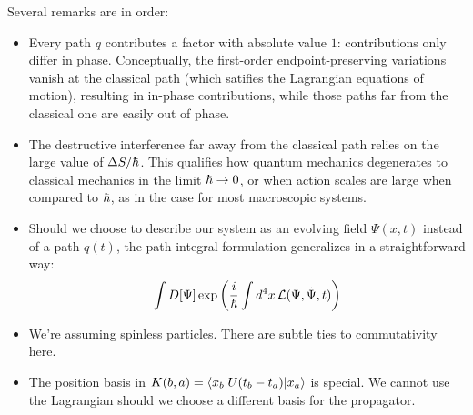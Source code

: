 \begin{remark} 
    Several remarks are in order:
    \begin{itemize}
    \item 
        Every path $q$ contributes a factor with absolute value $1$: contributions only differ in phase. 
        Conceptually, the first-order endpoint-preserving variations vanish at the classical path (which satifies the 
        Lagrangian equations of motion), resulting in in-phase contributions, while those paths far from 
        the classical one are easily out of phase.
    \item 
        The destructive interference far away from the classical path relies on the large value of $\Delta S / \hbar$. 
        This qualifies how quantum mechanics degenerates to classical mechanics in the limit $\hbar\to 0$, or when action 
        scales are large when compared to $\hbar$, as in the case for most macroscopic systems. 
    \item 
        Should we choose to describe our system as an evolving field $\Psi(x, t)$ instead of a path $q(t)$,
        the path-integral formulation generalizes in a straightforward way:
        \[\int D[\Psi]\exp\left(\dfrac i {\hbar} \int d^4x\, \mathcal L(\Psi, \dot \Psi, t)\right)\]
    \item 
        We're assuming spinless particles. 
        There are subtle ties to commutativity here. 
    \item 
        The position basis in $K(b, a)=\langle x_b|U(t_b-t_a)|x_a\rangle$ is special. We cannot use the Lagrangian 
        should we choose a different basis for the propagator.  
    \end{itemize}
\end{remark}

